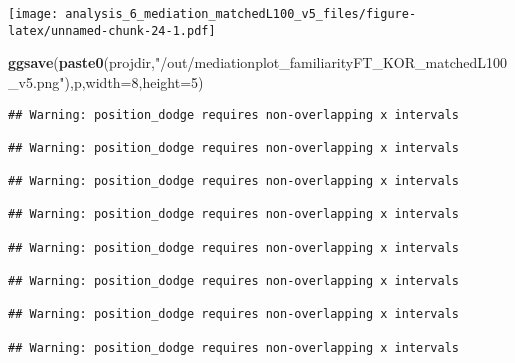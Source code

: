 \documentclass[
]{article}
\newenvironment{Shaded}{\begin{snugshade}}{\end{snugshade}}
\newcommand{\DataTypeTok}[1]{\textcolor[rgb]{0.13,0.29,0.53}{#1}}
\newcommand{\DecValTok}[1]{\textcolor[rgb]{0.00,0.00,0.81}{#1}}
\newcommand{\KeywordTok}[1]{\textcolor[rgb]{0.13,0.29,0.53}{\textbf{#1}}}
\newcommand{\NormalTok}[1]{#1}
\newcommand{\StringTok}[1]{\textcolor[rgb]{0.31,0.60,0.02}{#1}}
\begin{document}
\texttt{[image: analysis\_6\_mediation\_matchedL100\_v5\_files/figure-latex/unnamed-chunk-24-1.pdf]}

\begin{Shaded}
\begin{Highlighting}[]
\KeywordTok{ggsave}\NormalTok{(}\KeywordTok{paste0}\NormalTok{(projdir,}\StringTok{"/out/mediationplot_familiarityFT_KOR_matchedL100_v5.png"}\NormalTok{),p,}\DataTypeTok{width=}\DecValTok{8}\NormalTok{,}\DataTypeTok{height=}\DecValTok{5}\NormalTok{)}
\end{Highlighting}
\end{Shaded}

\begin{verbatim}
## Warning: position_dodge requires non-overlapping x intervals

## Warning: position_dodge requires non-overlapping x intervals

## Warning: position_dodge requires non-overlapping x intervals

## Warning: position_dodge requires non-overlapping x intervals

## Warning: position_dodge requires non-overlapping x intervals

## Warning: position_dodge requires non-overlapping x intervals

## Warning: position_dodge requires non-overlapping x intervals

## Warning: position_dodge requires non-overlapping x intervals
\end{verbatim}
\end{document}
